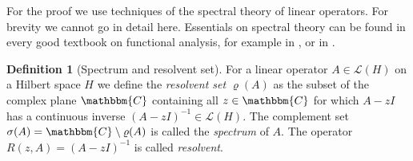\documentclass[a4paper,11pt]{article}
\theoremstyle{plain} %
\theoremstyle{definition} %
\newtheorem{definition}{Definition}[section]
\theoremstyle{remark} %
\theoremstyle{remark}
\begin{document}
%
For the proof we use techniques of the spectral theory of linear operators. For brevity we cannot go in detail here. Essentials on spectral theory can be found in every good textbook on functional analysis, for example in \cite[pp 130 f]{meinhold1990pdg}, or in \cite[pp 465–505, pp 542–571]{heuser1986funktionalanalysis}.
\begin{definition}[Spectrum and resolvent set]
For a linear operator $A \in \mathscr{L} (H) $ on a Hilbert space $H$ we define the \emph{resolvent set} $\varrho (A) $ as the subset of the complex plane $\mathbbm{C}$ containing all $ z \in \mathbbm{C}$ for which $ A - zI $ has a continuous inverse $(A - zI)^{-1} \in \mathscr{L} (H) $. The complement set $\sigma (A) = \mathbbm{C}\setminus \varrho (A)$ is called the \emph{spectrum} of $A$. The operator $R(z,A) = (A - zI)^{-1} $ is called \emph{resolvent}.
\end{definition}
\end{document}
